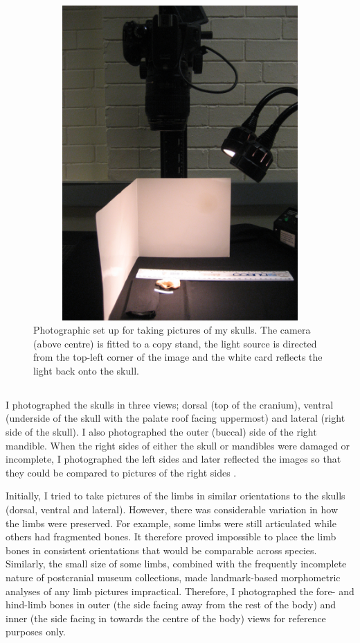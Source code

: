 \begin{figure}[h] 
  \centering
  \includegraphics[width=12cm, height=12cm, keepaspectratio=true]{Methods/figures/camera.jpg}
    \caption[Photographic set up]
    {Photographic set up for taking pictures of my skulls. The camera (above centre) is fitted to a copy stand, the light source is directed from the top-left corner of the image and the white card reflects the light back onto the skull. }%
  \label{fig:camera}
  \end{figure}

\subsection{}
	I photographed the skulls in three views; dorsal (top of the cranium), ventral (underside of the skull with the palate roof facing uppermost) and lateral (right side of the skull). I also photographed the outer (buccal) side of the right mandible. When the right sides of either the skull or mandibles were damaged or incomplete, I photographed the left sides and later reflected the images so that they could be compared to pictures of the right sides \citep[e.g.][]{Barrow2008}.

	Initially, I tried to take pictures of the limbs in similar orientations to the skulls (dorsal, ventral and lateral). However, there was considerable variation in how the limbs were preserved. For example, some limbs were still articulated while others had fragmented bones. It therefore proved impossible to place the limb bones in consistent orientations that would be comparable across species. Similarly, the small size of some limbs, combined with the frequently incomplete nature of postcranial museum collections, made landmark-based morphometric analyses of any limb pictures impractical. Therefore, I photographed the fore- and hind-limb bones in outer (the side facing away from the rest of the body) and inner (the side facing in towards the centre of the body) views for reference purposes only.

